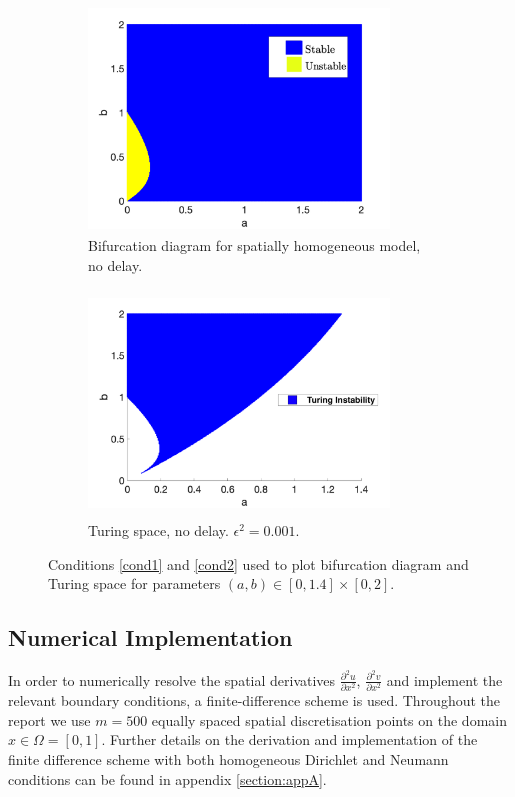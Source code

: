 \begin{figure}[H]
    \centering
    \begin{subfigure}[b]{0.45\textwidth}
        \centering
        \includegraphics[width=8cm,height = 6cm]{bifsh.png}
        \caption{Bifurcation diagram for spatially homogeneous model, no delay.}
        \label{fig:bifsh}
    \end{subfigure}
    \hfill
    \begin{subfigure}[b]{0.45\textwidth}
        \centering
        \includegraphics[width=8cm,height = 6cm]{turingspace.png}
        \caption{Turing space, no delay. $\epsilon^2=0.001$.}
        \label{fig:turingspace}
    \end{subfigure}
    \caption{Conditions \eqref{cond1} and \eqref{cond2} used to plot bifurcation diagram and Turing space for parameters $(a,b)\in[0,1.4]\times[0,2]$.}
    \label{fig:dispfixed}
\end{figure}

\subsection{Numerical Implementation}\label{section:numimp}
In order to numerically resolve the spatial derivatives $\frac{\partial^2 u}{\partial x^2}$, $\frac{\partial^2 v}{\partial x^2}$ and implement the relevant boundary conditions, a finite-difference scheme is used. Throughout the report we use $m=500$ equally spaced spatial discretisation points on the domain $x\in\Omega=[0,1]$. Further details on the derivation and implementation of the finite difference scheme with both homogeneous Dirichlet and Neumann conditions can be found in appendix \ref{section:appA}.

